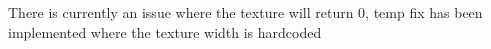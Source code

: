 
\begin{DoxyRefList}
\item[\label{bug__bug000001}%
\Hypertarget{bug__bug000001}%
Member \hyperlink{class_text_box_a19cb5e85c864060ecdb2fe2bab6fd54d}{Text\+Box\+:\+:create\+Strings} (std\+::string text, T\+T\+F\+\_\+\+Font $\ast$font)]There is currently an issue where the texture will return 0, temp fix has been implemented where the texture width is hardcoded 
\end{DoxyRefList}